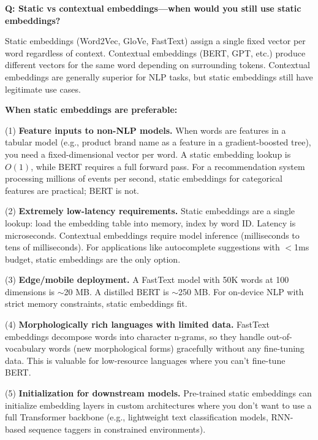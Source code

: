 \begin{interviewq}
\textbf{Q: Static vs contextual embeddings---when would you still use static embeddings?}

 \quad {} \quad \badgefreq{\freqmed}

\stronganswer

Static embeddings (Word2Vec, GloVe, FastText) assign a single fixed vector per word regardless of context. Contextual embeddings (BERT, GPT, etc.) produce different vectors for the same word depending on surrounding tokens. Contextual embeddings are generally superior for NLP tasks, but static embeddings still have legitimate use cases.

\textbf{When static embeddings are preferable:}

(1) \textbf{Feature inputs to non-NLP models.} When words are features in a tabular model (e.g., product brand name as a feature in a gradient-boosted tree), you need a fixed-dimensional vector per word. A static embedding lookup is $O(1)$, while BERT requires a full forward pass. For a recommendation system processing millions of events per second, static embeddings for categorical features are practical; BERT is not.

(2) \textbf{Extremely low-latency requirements.} Static embeddings are a single lookup: load the embedding table into memory, index by word ID. Latency is microseconds. Contextual embeddings require model inference (milliseconds to tens of milliseconds). For applications like autocomplete suggestions with $<$1ms budget, static embeddings are the only option.

(3) \textbf{Edge/mobile deployment.} A FastText model with 50K words at 100 dimensions is $\sim$20 MB. A distilled BERT is $\sim$250 MB. For on-device NLP with strict memory constraints, static embeddings fit.

(4) \textbf{Morphologically rich languages with limited data.} FastText embeddings decompose words into character n-grams, so they handle out-of-vocabulary words (new morphological forms) gracefully without any fine-tuning data. This is valuable for low-resource languages where you can't fine-tune BERT.

(5) \textbf{Initialization for downstream models.} Pre-trained static embeddings can initialize embedding layers in custom architectures where you don't want to use a full Transformer backbone (e.g., lightweight text classification models, RNN-based sequence taggers in constrained environments).


\end{interviewq}
